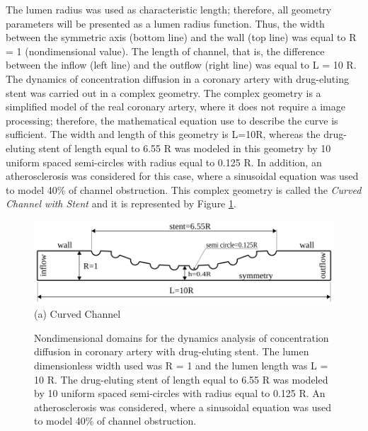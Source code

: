 \documentclass[10pt,fleqn,a4paper,twoside]{article}
\begin{document}
\smallskip
{The lumen radius was used as characteristic
length; therefore,
all geometry parameters will be presented
as a lumen radius function.
Thus, the width
between the symmetric axis (bottom line)
and the wall (top line) was equal to R = 1 (nondimensional value).
The length of channel, that is, the difference between the
inflow (left line) and the outflow (right line) was
equal to L = 10 R.}
The dynamics of concentration diffusion in 
a coronary artery with drug-eluting stent
was carried out in a complex geometry.
The complex geometry is a simplified model 
of the real coronary artery, where it does not require a image 
processing; therefore, the
mathematical equation use to describe the curve is sufficient. 
The width and length of this
geometry is L=10R, whereas the drug-eluting stent of length equal to
6.55 R was modeled in this geometry by 10 uniform 
spaced semi-circles with radius equal
to 0.125 R. In addition, an atherosclerosis was 
considered for this case, where a sinusoidal equation
was used to model 40\% of channel obstruction.
This complex geometry is called the 
\textit{Curved Channel with Stent} and it is represented
by Figure \ref{geometry}. 




\begin{figure}[H]
     \begin{center}
      \includegraphics[scale=0.6]{./figure/CurvedStrut.png}\\
     (a) Curved Channel
     \end{center}
     \label{geometry}
     \caption{
Nondimensional domains for the dynamics analysis of 
concentration diffusion in coronary artery with drug-eluting stent. 
The lumen dimensionless width used was R = 1 and 
the lumen length was L = 10 R. The
drug-eluting stent of length equal to 6.55 R was modeled 
by 10 uniform spaced semi-circles with radius
equal to 0.125 R. An atherosclerosis was considered, 
where a sinusoidal equation was used to model 40\% of
channel obstruction.
}
\end{figure}
\end{document}
